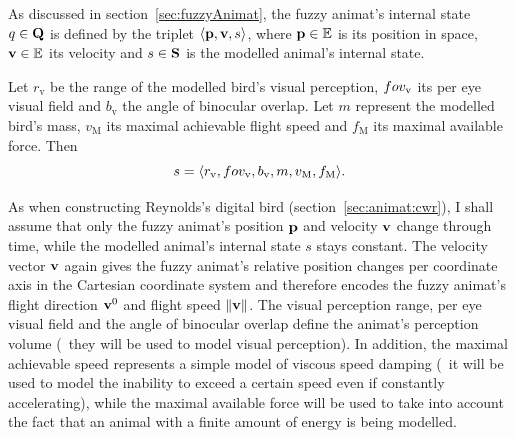 As discussed in section~\ref{sec:fuzzyAnimat}, the fuzzy animat's internal state $q \in {\ensuremath{\mathbf{Q}}}$ is defined by the triplet $\langle {\ensuremath{\mathbf{p}}}, {\mathbf{v}}, s \rangle$, where ${\mathbf{p}} \in \mathbb{E}$ is its position in space, ${\mathbf{v}} \in \mathbb{E}$ its velocity and $s \in {\ensuremath{\mathbf{S}}}$ is the modelled animal's internal state. 

\begin{defn}
\label{def:fuzzyAnimat:s:afd}
Let $r_\mathrm{v}$ be the range of the modelled bird's visual perception, $fov_\mathrm{v}$ its per eye visual field and $b_\mathrm{v}$ the angle of binocular overlap. Let $m$ represent the modelled bird's mass, $v_\mathrm{M}$ its maximal achievable flight speed and $f_\mathrm{M}$ its maximal available force. Then 
\begin{equation}
s=\langle r_\mathrm{v}, fov_\mathrm{v}, b_\mathrm{v}, m, v_\mathrm{M}, f_\mathrm{M} \rangle.
\end{equation}
\end{defn}

As when constructing Reynolds's digital bird (section~\ref{sec:animat:cwr}), I shall assume that only the fuzzy animat's position ${\mathbf{p}}$ and velocity ${\mathbf{v}}$ change through time, while the modelled animal's internal state $s$ stays constant. The velocity vector ${\mathbf{v}}$ again gives the fuzzy animat's relative position changes per coordinate axis in the Cartesian coordinate system and therefore encodes the fuzzy animat's flight direction ${\mathbf{v}}^0$ and flight speed $\left\|{\mathbf{v}}\right\|$. The visual perception range, per eye visual field and the angle of binocular overlap define the animat's perception volume (\ie\ they will be used to model visual perception). In addition, the maximal achievable speed represents a simple model of viscous speed damping (\ie\ it will be used to model the inability to exceed a certain speed even if constantly accelerating), while the maximal available force will be used to take into account the fact that an animal with a finite amount of energy is being modelled.

